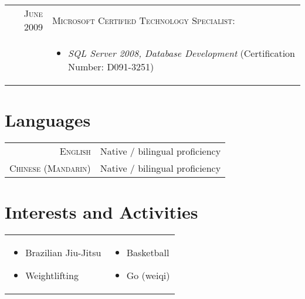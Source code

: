 \documentclass[a4paper,10pt]{article} %
\begin{document}
\begin{tabular}{rl}

  \textsc{June} 2009 & \textsc{Microsoft Certified Technology Specialist:} \\ 
                     & \parbox{0.9\textwidth}{
                         \begin{itemize}
                           \item \emph{SQL Server 2008, Database Development} 
                                 (Certification Number: D091-3251)
                         \end{itemize}
                       }

\end{tabular}


\section{Languages}

\begin{tabular}{rl}
\textsc{English}            & Native / bilingual proficiency \\
\textsc{Chinese (Mandarin)} & Native / bilingual proficiency \\
\end{tabular}


\section{Interests and Activities}

\begin{tabular}{p{}p{}}

  \begin{itemize}
    \item Brazilian Jiu-Jitsu
    \item Weightlifting
  \end{itemize} 

&

  \begin{itemize}
    \item Basketball
    \item Go (weiqi)
  \end{itemize}

\end{tabular}
\end{document}
